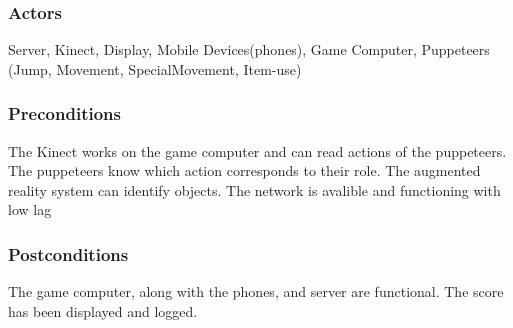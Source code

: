 \documentclass[10pt,letterpaper,oneside,english]{report}
\begin{document}
	\subsubsection{Actors} Server, Kinect, Display, Mobile Devices(phones), Game Computer, Puppeteers (Jump, Movement, SpecialMovement, Item-use)
	\subsubsection{Preconditions} The Kinect works on the game computer and can read actions of the puppeteers. The puppeteers know which action corresponds to their role. The augmented reality system can identify objects. The network is avalible and functioning with low lag
	\subsubsection{Postconditions} The game computer, along with the phones, and server are functional. The score has been displayed and logged.
\end{document}
